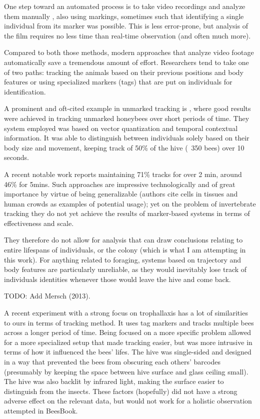 One step toward an automated process is to take video recordings and analyze
them manually \citep{naug_structure_2008}, also using markings, sometimes such
that identifying a single individual from its marker was possible. This is less
error-prone, but analysis of the film requires no less time than real-time
observation (and often much more). 

Compared to both those methods, modern approaches that analyze video footage
automatically save a tremendous amount of effort. Researchers tend to take one
of two paths: tracking the animals based on their previous positions and body
features or using specialized markers (tags) that are put on individuals for
identification.

A prominent and oft-cited example in unmarked tracking is
\citep{kimura_new_2011}, where good results were achieved in tracking unmarked
honeybees over short periods of time. They system employed was based on vector
quantization and temporal contextual information. It was able to distinguish
between individuals solely based on their body size and movement, keeping track
of 50\% of the hive (~350 bees) over 10 seconds. 

A recent notable work \citep{bozek_pixel_2018} reports maintaining 71\% tracks
for over 2 min, around 46\% for 5mins. Such approaches are impressive
technologically and of great importance by virtue of being generalizable
(authors cite cells in tissues and human crowds as examples of potential usage);
yet on the problem of invertebrate tracking they do not yet achieve the results
of marker-based systems in terms of effectiveness and scale. 

They therefore do not allow for analysis that can draw conclusions relating to
entire lifespans of individuals, or the colony (which is what I am attempting in
this work). For anything related to foraging, systems based on trajectory and
body features are particularly unreliable, as they would inevitably lose track
of individuals\’ identities whenever those would leave the hive and come back.

TODO: Add Mersch (2013).

A recent experiment with a strong focus on trophallaxis
\citep{gernat_automated_2018} has a lot of similarities to ours in terms of
tracking method. It uses tag markers and tracks multiple bees across a longer
period of time. Being focused on a more specific problem allowed for a more
specialized setup that made tracking easier, but was more intrusive in terms of
how it influenced the bees’ lifes. The hive was single-sided and designed in a
way that prevented the bees from obscuring each others’ barcodes (presumably by
keeping the space between hive surface and glass ceiling small). The hive was
also backlit by infrared light, making the surface easier to distinguish from
the insects. These factors (hopefully) did not have a strong adverse effect on
the relevant data, but would not work for a holistic observation attempted in
BeesBook.

